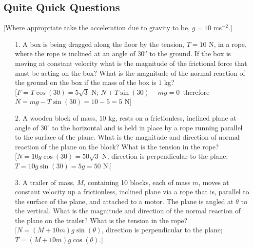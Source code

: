 \subsection*{Quite Quick Questions}
[Where appropriate take the acceleration due to gravity to be, $g=10$ ms$^{-2}$.]
\begin{itemize}
\item[1.]  A box is being dragged along the floor by the tension, $T=10$ N, in a rope, where the rope is inclined at an angle of $30^o$ to the ground.  If the box is moving at constant velocity what is the magnitude of the frictional force that must be acting on the box?  What is the magnitude of the normal reaction of the ground on the box if the mass of the box is $1$ kg?\\
\color{red}[$F=T\cos(30)=5\sqrt{3}$ N; \nl
$N+T\sin(30)-mg=0$\ therefore\nl
$N=mg-T\sin(30)=10-5 = 5$ N]\color{black}
\item[2.] A wooden block of mass, $10$ kg, rests on a frictionless, inclined plane at angle of $30^\circ$ to the horizontal and is held in place by a rope running parallel to the surface of the plane.  What is the magnitude and direction of normal reaction of the plane on the block? What is the tension in the rope? \\
\color{red}[$N=10g\cos(30)=50\sqrt{3}$ N, direction is perpendicular to the plane;\nl $T=10g\sin(30)=5g=50$ N.]\color{black}
\item[3.] A trailer of mass, $M$, containing 10 blocks, each of mass $m$, moves at constant velocity up a frictionless, inclined plane via a rope that is, parallel to the surface of the plane, and attached to a motor.  The plane is angled at $\theta$ to the vertical.  What is the magnitude and direction of the normal reaction of the plane on the trailer? What is the tension in the rope?\\
\color{red}[$N=(M+10m)g\sin(\theta)$, direction is perpendicular to the plane; \nl $T=(M+10m)g\cos(\theta)$.]\color{black}
\end{itemize}




